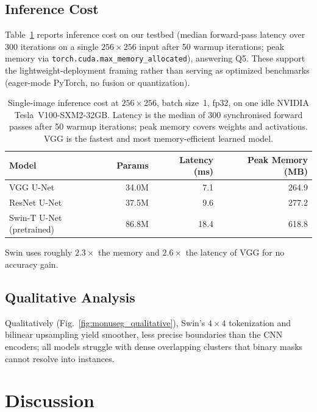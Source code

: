 \documentclass[runningheads]{llncs}
\begin{document}
\subsection{Inference Cost}
\label{sec:inference_cost}

Table~\ref{tab:inference_cost} reports inference cost on our testbed (median forward-pass latency over 300 iterations on a single $256\times256$ input after 50 warmup iterations; peak memory via \texttt{torch.cuda.max\_memory\_allocated}), answering Q5. These support the lightweight-deployment framing rather than serving as optimized benchmarks (eager-mode PyTorch, no fusion or quantization).

\begin{table}[t]
\centering
\caption{Single-image inference cost at $256\times256$, batch size~1, fp32, on one
idle NVIDIA Tesla~V100-SXM2-32GB. Latency is the median of 300 synchronised forward
passes after 50 warmup iterations; peak memory covers weights and activations. VGG is
the fastest and most memory-efficient learned model.}
\label{tab:inference_cost}
\begin{tabular}{@{}lrrr@{}}
\toprule
\textbf{Model} & \textbf{Params} & \textbf{Latency (ms)} & \textbf{Peak Memory (MB)} \\
\midrule
VGG U-Net & 34.0M & 7.1 & 264.9 \\
ResNet U-Net & 37.5M & 9.6 & 277.2 \\
Swin-T U-Net (pretrained) & 86.8M & 18.4 & 618.8 \\
\bottomrule
\end{tabular}
\end{table}

Swin uses roughly $2.3\times$ the memory and $2.6\times$ the latency of VGG for no accuracy gain.

\subsection{Qualitative Analysis}

Qualitatively (Fig.~\ref{fig:monuseg_qualitative}), Swin's $4\times4$ tokenization and bilinear upsampling yield smoother, less precise boundaries than the CNN encoders; all models struggle with dense overlapping clusters that binary masks cannot resolve into instances.

\section{Discussion}
\end{document}
